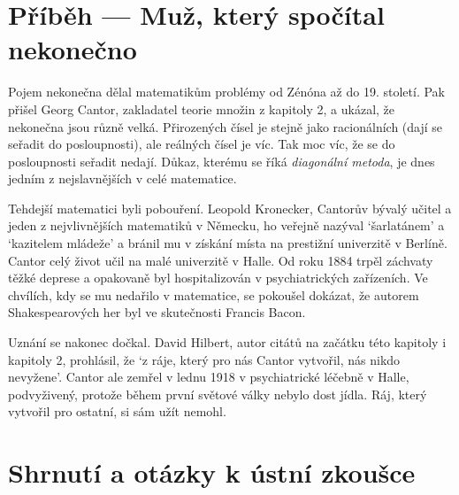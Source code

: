 \section{Příběh --- Muž, který spočítal nekonečno}

Pojem nekonečna dělal matematikům problémy od Zénóna až do 19. století. Pak přišel Georg Cantor, zakladatel teorie množin z kapitoly 2, a ukázal, že nekonečna jsou různě velká. Přirozených čísel je stejně jako racionálních (dají se seřadit do posloupnosti), ale reálných čísel je víc. Tak moc víc, že se do posloupnosti seřadit nedají. Důkaz, kterému se říká \textit{diagonální metoda}, je dnes jedním z nejslavnějších v celé matematice.

Tehdejší matematici byli pobouření. Leopold Kronecker, Cantorův bývalý učitel a jeden z nejvlivnějších matematiků v Německu, ho veřejně nazýval `šarlatánem' a `kazitelem mládeže' a bránil mu v získání místa na prestižní univerzitě v Berlíně. Cantor celý život učil na malé univerzitě v Halle. Od roku 1884 trpěl záchvaty těžké deprese a opakovaně byl hospitalizován v psychiatrických zařízeních. Ve chvílích, kdy se mu nedařilo v matematice, se pokoušel dokázat, že autorem Shakespearových her byl ve skutečnosti Francis Bacon.

Uznání se nakonec dočkal. David Hilbert, autor citátů na začátku této kapitoly i kapitoly 2, prohlásil, že `z ráje, který pro nás Cantor vytvořil, nás nikdo nevyžene'. Cantor ale zemřel v lednu 1918 v psychiatrické léčebně v Halle, podvyživený, protože během první světové války nebylo dost jídla. Ráj, který vytvořil pro ostatní, si sám užít nemohl.

\section{Shrnutí a otázky k ústní zkoušce}

